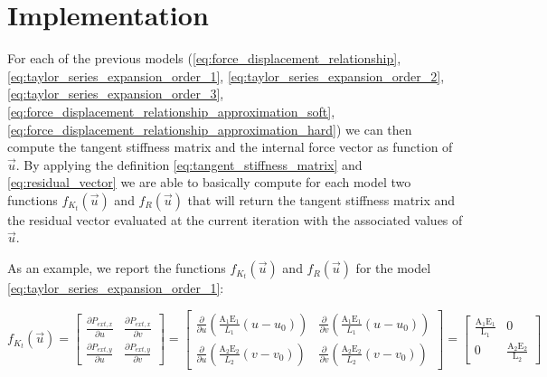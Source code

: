 \section{Implementation}
\label{sec:implementation}

For each of the previous models (\ref{eq:force_displacement_relationship},\ref{eq:taylor_series_expansion_order_1}, \ref{eq:taylor_series_expansion_order_2}, \ref{eq:taylor_series_expansion_order_3}, \ref{eq:force_displacement_relationship_approximation_soft}, \ref{eq:force_displacement_relationship_approximation_hard}) we can then compute the tangent stiffness matrix and the internal force vector as function of $\vec{u}$.
By applying the definition \ref{eq:tangent_stiffness_matrix} and \ref{eq:residual_vector} we are able to basically compute for each model two functions $f_{K_t}(\vec{u})$ and $f_{R}(\vec{u})$ that will return the tangent stiffness matrix and the residual vector evaluated at the current iteration with the associated values of $\vec{u}$.

As an example, we report the functions $f_{K_t}(\vec{u})$ and $f_{R}(\vec{u})$ for the model \ref{eq:taylor_series_expansion_order_1}:

\begin{equation}
    f_{K_t}(\vec{u}) =
    \begin{bmatrix}
        \frac{\partial P_{ext,x}}{\partial u} & \frac{\partial P_{ext,x}}{\partial v} \\
        \frac{\partial P_{ext,y}}{\partial u} & \frac{\partial P_{ext,y}}{\partial v}
    \end{bmatrix}
    =
    \begin{bmatrix}
        \frac{\partial}{\partial u} \left( \frac{\text{A}_1 \text{E}_1}{L_1} \left( u - u_0 \right) \right) & \frac{\partial}{\partial v} \left( \frac{\text{A}_1 \text{E}_1}{L_1} \left( u - u_0 \right) \right) \\
        \frac{\partial}{\partial u} \left( \frac{\text{A}_2 \text{E}_2}{L_2} \left( v - v_0 \right) \right) & \frac{\partial}{\partial v} \left( \frac{\text{A}_2 \text{E}_2}{L_2} \left( v - v_0 \right) \right)
    \end{bmatrix}
    =
    \begin{bmatrix}
        \frac{\text{A}_1 \text{E}_1}{\text{L}_1} & 0                                        \\
        0                                        & \frac{\text{A}_2 \text{E}_2}{\text{L}_2}
    \end{bmatrix}
    \label{eq:tangent_stiffness_matrix_taylor_series_expansion_order_1}
\end{equation}

